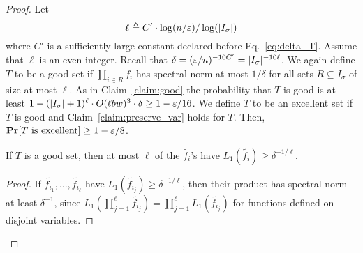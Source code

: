\begin{proof}
Let \begin{equation}\label{eq:def ell}
	\ell \triangleq C'\cdot \log(n/\varepsilon)/\log(|I_{\sigma}|)
\end{equation}
where $C'$ is a sufficiently large constant declared before Eq.~\eqref{eq:delta_T}. 
Assume that $\ell$ is an even integer.
Recall that $\delta = (\varepsilon/n)^{-10C'} = |I_{\sigma}|^{-10 \ell}$.
We again define $T$ to be a {\sf good} set if $\prod_{i\in R}\tilde{f_i}$ has spectral-norm at most $1/\delta$ for all sets $R\subseteq I_{\sigma}$ of size at most $\ell$. As in Claim~\ref{claim:good} the probability that $T$ is good is at least $1-(|I_{\sigma}|+1)^{\ell} \cdot O(\ell b w)^3 \cdot \delta \ge 1-\varepsilon/16$.
We define $T$ to be an {\sf excellent} set if $T$ is good and Claim~\ref{claim:preserve_var} holds for $T$. Then, $\mathop{\bf Pr\/}[T\text{~is excellent}] \ge 1-\varepsilon/8$.
\begin{claim}
 If $T$ is a good set, then at most $\ell$ of the $\tilde{f_i}$'s have $L_1(\tilde{f_i}) \ge \delta^{-1/\ell}$.
\end{claim}
\begin{proof}
	If $\tilde{f_{i_1}}, \ldots, \tilde{f_{i_\ell}}$ have
	$L_1(\tilde{f_{i_j}})\ge \delta^{-1/\ell}$, then their product  has spectral-norm at least $\delta^{-1}$, since $L_1(\prod_{j=1}^{\ell}\tilde{f_{i_j}}) = \prod_{j=1}^{\ell} L_1(\tilde{f_{i_j}})$ for functions defined on disjoint variables.
\end{proof}


\end{proof}
